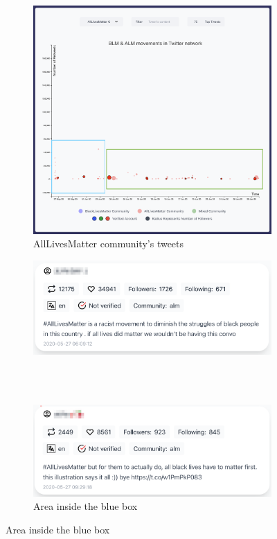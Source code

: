 \begin{figure}[H]

\begin{subfigure}{.5\textwidth}
  \centering
  \captionsetup{justification=centering}
  \includegraphics[width=1\linewidth]{Report-latex/tex_files/pics/example/obser1.png}  
  \caption{AllLivesMatter community's tweets}
  \label{fig:sub-second}
\end{subfigure}
\begin{subfigure}{.5\textwidth}
  \centering
  \captionsetup{justification=centering}
  \includegraphics[width=1\linewidth]{Report-latex/tex_files/pics/example/obser2.png}
  
  \\\
  
  \includegraphics[width=1\linewidth]{Report-latex/tex_files/pics/example/obser3.png}
  \caption{Area inside the blue box}
  \label{fig:sub-second}
\end{subfigure}


\end{figure}
